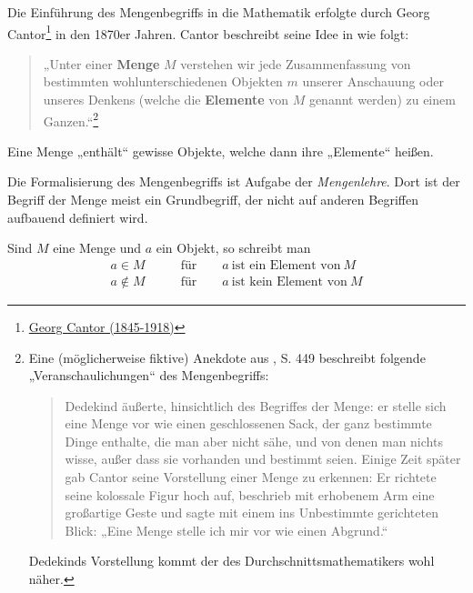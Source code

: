 \begin{defin}[Mengen] \label{mengenimlogikkapitel}
    Die Einführung des Mengenbegriffs in die Mathematik erfolgte durch Georg Cantor\footnote{\href{https://de.wikipedia.org/wiki/Georg_Cantor}{Georg Cantor (1845-1918)}} in den 1870er Jahren. Cantor beschreibt seine Idee in \cite{Can95} wie folgt:
    \begin{quote}
        „Unter einer \textbf{Menge} $M$ verstehen wir jede Zusammenfassung von bestimmten wohlunterschiedenen Objekten $m$ unserer Anschauung oder unseres Denkens (welche die \textbf{Elemente} von $M$ genannt werden) zu einem Ganzen.“\footnote{Eine (möglicherweise fiktive) Anekdote aus \cite{Ded32}, S. 449 beschreibt folgende „Veranschaulichungen“ des Mengenbegriffs:
    \begin{quote}
        Dedekind äußerte, hinsichtlich des Begriffes der Menge: er stelle sich eine Menge vor wie einen geschlossenen Sack, der ganz bestimmte Dinge enthalte, die man aber nicht sähe, und von denen man nichts wisse, außer dass sie vorhanden und bestimmt seien. Einige Zeit später gab Cantor seine Vorstellung einer Menge zu erkennen: Er richtete seine kolossale Figur hoch auf, beschrieb mit erhobenem Arm eine großartige Geste und sagte mit einem ins Unbestimmte gerichteten Blick: „Eine Menge stelle ich mir vor wie einen Abgrund.“
    \end{quote}
    Dedekinds Vorstellung kommt der des Durchschnittsmathematikers wohl näher.}
    \end{quote}
    Eine Menge „enthält“ gewisse Objekte, welche dann ihre „Elemente“ heißen.

    Die Formalisierung des Mengenbegriffs ist Aufgabe der \emph{Mengenlehre}. Dort ist der Begriff der Menge meist ein Grundbegriff, der nicht auf anderen Begriffen aufbauend definiert wird.
\end{defin}


\begin{nota}[Elementzeichen]
    Sind $M$ eine Menge und $a$ ein Objekt, so schreibt man
    \begin{align*}
        a\in M\qquad&\text{für}\qquad a\ \text{ist ein Element von}\ M \\
        a\notin M\qquad&\text{für}\qquad a\ \text{ist kein Element von}\ M
    \end{align*}
\end{nota}


